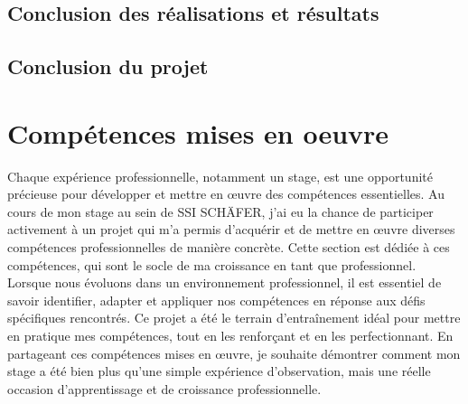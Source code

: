 \documentclass[a4paper, 12pt, french]{article}
\begin{document}
			\subsection{Conclusion des réalisations et résultats}
			
			\subsection{Conclusion du projet}
			

		\newpage

		\section{Compétences mises en oeuvre}
			Chaque expérience professionnelle, notamment un stage, est une opportunité précieuse pour développer et mettre en œuvre des compétences essentielles. Au cours de mon stage au sein de SSI SCHÄFER, j'ai eu la chance de participer activement à un projet qui m'a permis d'acquérir et de mettre en œuvre diverses compétences professionnelles de manière concrète. Cette section est dédiée à ces compétences, qui sont le socle de ma croissance en tant que professionnel.\\

			Lorsque nous évoluons dans un environnement professionnel, il est essentiel de savoir identifier, adapter et appliquer nos compétences en réponse aux défis spécifiques rencontrés. Ce projet a été le terrain d'entraînement idéal pour mettre en pratique mes compétences, tout en les renforçant et en les perfectionnant. En partageant ces compétences mises en œuvre, je souhaite démontrer comment mon stage a été bien plus qu'une simple expérience d'observation, mais une réelle occasion d'apprentissage et de croissance professionnelle.\\
\end{document}
